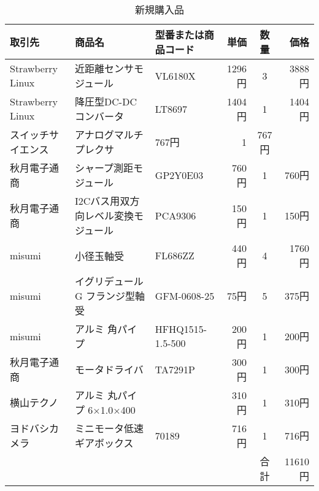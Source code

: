 \newpage
\begin{table}[H]
 \begin{center}
  \caption{新規購入品}
  \label{tab:list2}
  \begin{tabular}{|l|l|l|r|c|r|}  \hline
   取引先 & 商品名 & 型番または商品コード & 単価 & 数量 & 価格 \\   \hline \hline
   Strawberry Linux & 近距離センサモジュール & VL6180X & 1296円 & 3 & 3888円 \\    \hline
   Strawberry Linux & 降圧型DC-DCコンバータ & LT8697 & 1404円 & 1 & 1404円  \\      \hline
   スイッチサイエンス & アナログマルチプレクサ & 767円 & 1 &767円 & \\ \hline
   秋月電子通商 & シャープ測距モジュール & GP2Y0E03 & 760円 & 1 & 760円  \\      \hline
   秋月電子通商 & I2Cバス用双方向レベル変換モジュール & PCA9306 & 150円 & 1 & 150円  \\      \hline
   misumi & 小径玉軸受 & FL686ZZ & 440円 & 4 & 1760円  \\      \hline
   misumi & イグリデュールG フランジ型軸受 & GFM-0608-25 & 75円 & 5 & 375円 \\     \hline
   misumi & アルミ 角パイプ & HFHQ1515-1.5-500 & 200円 & 1 & 200円  \\       \hline
   秋月電子通商 & モータドライバ & TA7291P & 300円 & 1 & 300円  \\    \hline
   横山テクノ & アルミ 丸パイプ 6×1.0×400 & & 310円 & 1 & 310円 \\    \hline
   ヨドバシカメラ & ミニモータ低速ギアボックス & 70189 & 716円 & 1 & 716円  \\   \hline
   & & & & 合計 & 11610円  \\      \hline
  \end{tabular}
 \end{center}
\end{table}
